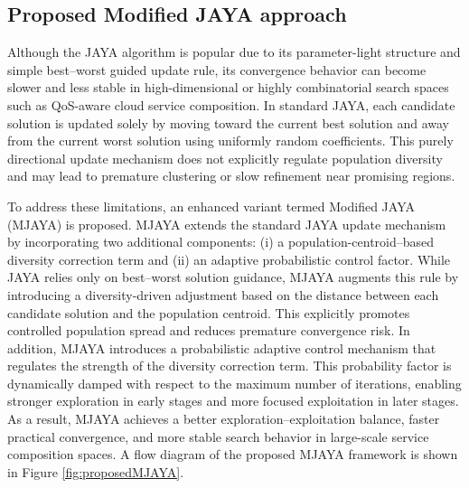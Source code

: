 \documentclass[3p,twocolumn]{elsarticle}
\theoremstyle{thmstyleone}%
\theoremstyle{thmstyletwo}%
\theoremstyle{thmstylethree}%
\begin{document}
\subsection{Proposed Modified JAYA approach}

Although the JAYA algorithm is popular due to its parameter-light structure and simple best–worst guided update rule, its convergence behavior can become slower and less stable in high-dimensional or highly combinatorial search spaces such as QoS-aware cloud service composition. In standard JAYA, each candidate solution is updated solely by moving toward the current best solution and away from the current worst solution using uniformly random coefficients. This purely directional update mechanism does not explicitly regulate population diversity and may lead to premature clustering or slow refinement near promising regions.

To address these limitations, an enhanced variant termed Modified JAYA (MJAYA) is proposed. MJAYA extends the standard JAYA update mechanism by incorporating two additional components: (i) a population-centroid–based diversity correction term and (ii) an adaptive probabilistic control factor. While JAYA relies only on best–worst solution guidance, MJAYA augments this rule by introducing a diversity-driven adjustment based on the distance between each candidate solution and the population centroid. This explicitly promotes controlled population spread and reduces premature convergence risk. In addition, MJAYA introduces a probabilistic adaptive control mechanism that regulates the strength of the diversity correction term. This probability factor is dynamically damped with respect to the maximum number of iterations, enabling stronger exploration in early stages and more focused exploitation in later stages. As a result, MJAYA achieves a better exploration–exploitation balance, faster practical convergence, and more stable search behavior in large-scale service composition spaces. A flow diagram of the proposed MJAYA framework is shown in Figure \ref{fig:proposedMJAYA}.
\end{document}
